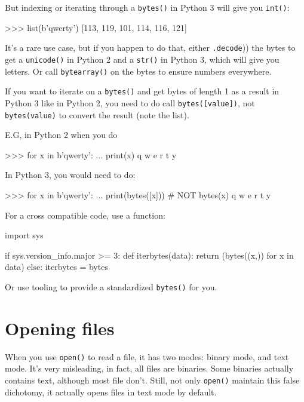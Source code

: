 But indexing or iterating through a \lstinline{bytes()} in Python 3 will give you \lstinline{int()}:

\begin{py2}
>>> list(b'qwerty')
[113, 119, 101, 114, 116, 121]
\end{py2}

It's a rare use case, but if you happen to do that, either \lstinline(.decode()) the bytes to get a \lstinline{unicode()} in Python 2 and a \lstinline{str()} in Python 3, which will give you letters. Or call \lstinline{bytearray()} on the bytes to ensure numbers everywhere.

\begin{warning}
If you want to iterate on a \lstinline{bytes()} and get bytes of length 1 as a result in Python 3 like in Python 2, you need to do call \lstinline{bytes([value])}, not \lstinline{bytes(value)} to convert the result (note the list).

E.G, in Python 2 when you do

\begin{py2}
>>> for x in b'qwerty':
...    print(x)
q
w
e
r
t
y

\end{py2}

In Python 3, you would need to do:

\begin{py3}
>>> for x in b'qwerty':
...    print(bytes([x])) # NOT bytes(x)
q
w
e
r
t
y

\end{py3}

For a cross compatible code, use a function:

\begin{py2and3}
import sys

if sys.version_info.major >= 3:
    def iterbytes(data):
        return (bytes((x,)) for x in data)
else:
    iterbytes = bytes
\end{py2and3}

Or use tooling to provide a standardized \lstinline{bytes()} for you.

\end{warning}

\section{Opening files}

When you use \lstinline{open()} to read a file, it has two modes: binary mode, and text mode. It's very misleading, in fact, all files are binaries. Some binaries actually contains text, although most file don't. Still, not only \lstinline{open()} maintain this false dichotomy, it actually opens files in text mode by default.


